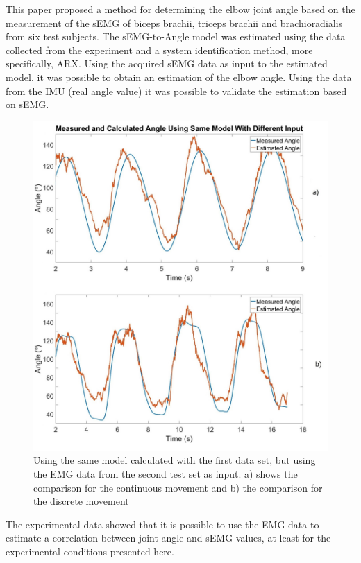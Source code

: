 \documentclass[letterpaper, 10 pt, conference]{ieeeconf}  %
\begin{document}
This paper proposed a method for determining the elbow joint angle based on the measurement of the sEMG of biceps brachii, triceps brachii and brachioradialis from six test subjects. The sEMG-to-Angle model was estimated using the data collected from the experiment and a system identification method, more specifically, ARX. Using the acquired sEMG data as input to the estimated model, it was possible to obtain an estimation of the elbow angle. Using the data from the IMU (real angle value) it was possible to validate the estimation based on sEMG.

\begin{figure}[bthp]
      \centering
      \includegraphics[width=0.95\columnwidth]{Images/Different_Input.jpg}
      \caption{Using the same model calculated with the first data set, but using the EMG data from the second test set as input. a) shows the comparison for the continuous movement and b) the comparison for the discrete movement}
      \label{Validation Procedure}
   \end{figure}

The experimental data showed that it is possible to use the EMG data to estimate a correlation between joint angle and sEMG values, at least for the experimental conditions presented here.
\end{document}
